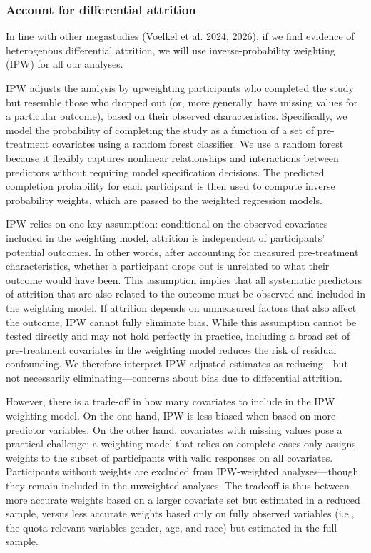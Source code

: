 \documentclass[
  letterpaper,
  DIV=11,
  numbers=noendperiod]{scrartcl}
\begin{document}
\subsubsection{Account for differential
attrition}\label{account-for-differential-attrition}

In line with other megastudies (Voelkel et al. 2024, 2026), if we find
evidence of heterogenous differential attrition, we will use
inverse-probability weighting (IPW) for all our analyses.

IPW adjusts the analysis by upweighting participants who completed the
study but resemble those who dropped out (or, more generally, have
missing values for a particular outcome), based on their observed
characteristics. Specifically, we model the probability of completing
the study as a function of a set of pre-treatment covariates using a
random forest classifier. We use a random forest because it flexibly
captures nonlinear relationships and interactions between predictors
without requiring model specification decisions. The predicted
completion probability for each participant is then used to compute
inverse probability weights, which are passed to the weighted regression
models.

IPW relies on one key assumption: conditional on the observed covariates
included in the weighting model, attrition is independent of
participants' potential outcomes. In other words, after accounting for
measured pre-treatment characteristics, whether a participant drops out
is unrelated to what their outcome would have been. This assumption
implies that all systematic predictors of attrition that are also
related to the outcome must be observed and included in the weighting
model. If attrition depends on unmeasured factors that also affect the
outcome, IPW cannot fully eliminate bias. While this assumption cannot
be tested directly and may not hold perfectly in practice, including a
broad set of pre-treatment covariates in the weighting model reduces the
risk of residual confounding. We therefore interpret IPW-adjusted
estimates as reducing---but not necessarily eliminating---concerns about
bias due to differential attrition.

However, there is a trade-off in how many covariates to include in the
IPW weighting model. On the one hand, IPW is less biased when based on
more predictor variables. On the other hand, covariates with missing
values pose a practical challenge: a weighting model that relies on
complete cases only assigns weights to the subset of participants with
valid responses on all covariates. Participants without weights are
excluded from IPW-weighted analyses---though they remain included in the
unweighted analyses. The tradeoff is thus between more accurate weights
based on a larger covariate set but estimated in a reduced sample,
versus less accurate weights based only on fully observed variables
(i.e., the quota-relevant variables gender, age, and race) but estimated
in the full sample.
\end{document}

